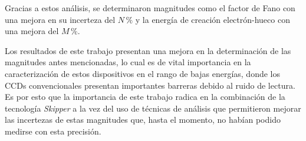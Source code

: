 Gracias a estos análisis, se determinaron magnitudes como el factor de Fano con una mejora en su incerteza del $N\,\%$ y la energía de creación electrón-hueco con una mejora del $M\,\%$.

Los resultados de este trabajo presentan una mejora en la determinación de las magnitudes antes mencionadas, lo cual es de vital importancia en la caracterización de estos dispositivos en el rango de bajas energías, donde los CCDs convencionales presentan importantes barreras debido al ruido de lectura. Es por esto que la importancia de este trabajo radica en la combinación de la tecnología \textit{Skipper} a la vez del uso de técnicas de análisis que permitieron mejorar las incertezas de estas magnitudes que, hasta el momento, no habían podido medirse con esta precisión.

\newpage
\thispagestyle{empty} \mbox{}
\thispagestyle{empty}
